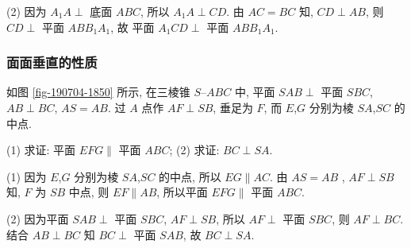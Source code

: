     (2) 因为 $A_1A\perp$ 底面 $ABC$, 所以 $A_1A\perp CD$. 由 $AC= BC$ 知, $CD\perp AB$, 则 $CD\perp$ 平面 $ABB_1A_1$, 故 平面 $A_1 CD\perp$ 平面 $ABB_1A_1$.
\endsolution
    
\subsubsection{面面垂直的性质}
\begin{example}
    如图 \ref{fig-190704-1850} 所示, 在三棱锥 $S\text{--}ABC$ 中, 平面 $SAB\perp$ 平面 $SBC$, $AB\perp BC$, $AS=AB$. 过 $A$ 点作 $AF\perp SB$, 垂足为 $F$, 而 $E$,$G$ 分别为棱 $SA$,$SC$ 的中点.
    
    (1) 求证: 平面 $EFG\parallel$ 平面 $ABC$;\qquad
    (2) 求证: $BC\perp SA$.
\end{example}
\beginsolution
    (1) 因为 $E$,$G$ 分别为棱 $SA$,$SC$ 的中点, 所以 $EG\parallel AC$. 由 $AS=AB$ , $AF\perp SB$ 知, $F$ 为 $SB$ 中点, 则 $EF\parallel AB$, 所以平面 $EFG\parallel$ 平面 $ABC$.

    (2) 因为平面 $SAB\perp$ 平面 $SBC$, $AF\perp SB$, 所以 $AF\perp$ 平面 $SBC$, 则 $AF\perp BC$. 结合 $AB\perp BC$ 知 $BC\perp$ 平面 $SAB$, 故 $BC\perp SA$.
\endsolution

